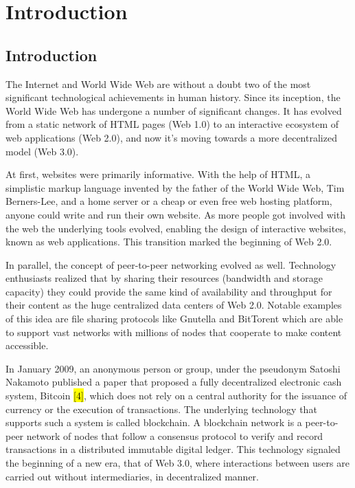 \chapter{Introduction}\label{chapter:introduction}

\section{Introduction}\label{sec:intro}
The Internet and World Wide Web are without a doubt two of the most significant technological achievements in human history. Since its inception, the World Wide Web has undergone a number of significant changes. It has evolved from a static network of HTML pages (Web 1.0) to an interactive ecosystem of web applications (Web 2.0), and now it's moving towards a more decentralized model (Web 3.0).

At first, websites were primarily informative. With the help of HTML, a simplistic markup language invented by the father of the World Wide Web, Tim Berners-Lee, and a home server or a cheap or even free web hosting platform, anyone could write and run their own website. As more people got involved with the web the underlying tools evolved, enabling the design of interactive websites, known as web applications. This transition marked the beginning of Web 2.0. 

In parallel, the concept of peer-to-peer networking evolved as well. Technology enthusiasts realized that by sharing their resources (bandwidth and storage capacity) they could provide the same kind of availability and throughput for their content as the huge centralized data centers of Web 2.0. Notable examples of this idea are file sharing protocols like Gnutella and BitTorent which are able to support vast networks with millions of nodes that cooperate to make content accessible. 

In January 2009, an anonymous person or group, under the pseudonym Satoshi Nakamoto published a paper that proposed a fully decentralized electronic cash system, Bitcoin \hl{[4]}, which does not rely on a central authority for the issuance of currency or the execution of transactions. The underlying technology that supports such a system is called blockchain. A blockchain network is a peer-to-peer network of nodes that follow a consensus protocol to verify and record transactions in a distributed immutable digital ledger. This technology signaled the beginning of a new era, that of Web 3.0, where interactions between users are carried out without intermediaries, in decentralized manner.

